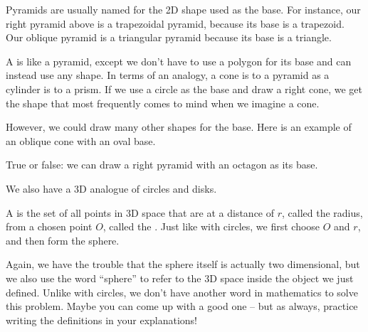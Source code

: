 \documentclass{ximera}
\begin{document}
Pyramids are usually named for the 2D shape used as the base. For instance, our right pyramid above is a trapezoidal pyramid, because its base is a trapezoid. Our oblique pyramid is a triangular pyramid because its base is a triangle.

A  is like a pyramid, except we don't have to use a polygon for its base and can instead use any shape. In terms of an analogy, a cone is to a pyramid as a cylinder is to a prism. If we use a circle as the base and draw a right cone, we get the shape that most frequently comes to mind when we imagine a cone.
\begin{image}
\end{image}


However, we could draw many other shapes for the base. Here is an example of an oblique cone with an oval base.
\begin{image}
\end{image}

\begin{question}
True or false: we can draw a right pyramid with an octagon as its base.
\begin{multipleChoice}
\end{multipleChoice}
\end{question}


We also have a 3D analogue of circles and disks. 
\begin{definition}
	A  is the set of all points in 3D space that are at a distance of $r$, called the radius, from a chosen point $O$, called the . Just like with circles, we first choose $O$ and $r$, and then form the sphere.
\end{definition}
Again, we have the trouble that the sphere itself is actually two dimensional, but we also use the word ``sphere'' to refer to the 3D space inside the object we just defined. Unlike with circles, we don't have another word in mathematics to solve this problem. Maybe you can come up with a good one -- but as always, practice writing the definitions in your explanations!
\end{document}
